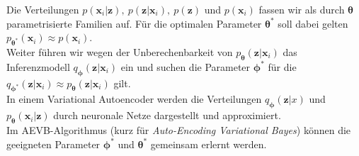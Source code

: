 \documentclass[12pt]{article}
\newcommand{\z}{\mathbf{z}}
\newcommand{\x}{\mathbf{x}_i}
\begin{document}
	Die Verteilungen $p(\x|\z),\ p(\z|\x),\ p(\z)$ und $p(\x)$ fassen wir als durch ${\boldsymbol\theta}$ parametrisierte Familien auf. Für die optimalen Parameter $\boldsymbol\theta^{*}$ soll dabei gelten $p_{\boldsymbol\theta^{*}}(\x) \approx p(\x)$.\\
	Weiter führen wir wegen der Unberechenbarkeit von $p_{\boldsymbol\theta}(\z|\x)$ das Inferenzmodell $q_{\boldsymbol\phi}(\z|\x)$ ein und suchen die Parameter $\boldsymbol\phi^{*}$ für die $q_{\boldsymbol\phi^{*}}(\z|\x) \approx p_{\boldsymbol\theta}(\z|\x)$ gilt.\\
	In einem Variational Autoencoder werden die Verteilungen $q_{\boldsymbol\phi}(\z|x)$ und $p_{\boldsymbol\theta}(\x|\z)$ durch neuronale Netze dargestellt und approximiert.\\
	Im AEVB-Algorithmus (kurz für \emph{Auto-Encoding Variational Bayes}) können die geeigneten Parameter $\boldsymbol\phi^{*}$ und $\boldsymbol\theta^{*}$ gemeinsam erlernt werden.
\end{document}
